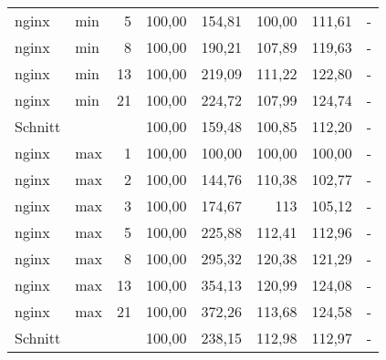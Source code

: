 \begin{footnotesize}
\begin{longtable}{llrrrrrr}
		nginx          & min     & 5          & 100,00 & 154,81                      & 100,00                         & 111,61                      & -                           \\
		nginx          & min     & 8          & 100,00 & 190,21                      & 107,89                      & 119,63                      & -                           \\
		nginx          & min     & 13         & 100,00 & 219,09                      & 111,22                      & 122,80                      & -                           \\
		nginx          & min     & 21         & 100,00 & 224,72                      & 107,99                      & 124,74                      & -                           \\ \hline
		Schnitt        &         &            & 100,00 & 159,48                      & 100,85                      & 112,20                      & -                           \\ \hline
		nginx          & max     & 1          & 100,00 & \cellcolor[HTML]{C0C0C0}100,00 & \cellcolor[HTML]{C0C0C0}100,00 & \cellcolor[HTML]{C0C0C0}100,00 & -                           \\
		nginx          & max     & 2          & 100,00 & 144,76                      & 110,38                      & 102,77                      & -                           \\
		nginx          & max     & 3          & 100,00 & 174,67                      & 113                         & 105,12                      & -                           \\
		nginx          & max     & 5          & 100,00 & 225,88                      & 112,41                      & 112,96                      & -                           \\
		nginx          & max     & 8          & 100,00 & 295,32                      & 120,38                      & 121,29                      & -                           \\
		nginx          & max     & 13         & 100,00 & 354,13                      & 120,99                      & 124,08                      & -                           \\
		nginx          & max     & 21         & 100,00 & 372,26                      & 113,68                      & 124,58                      & -                           \\ \hline
		Schnitt        &         &            & 100,00 & 238,15                      & 112,98                      & 112,97                      & -                           \\ \hline

\end{longtable}
\end{footnotesize}

